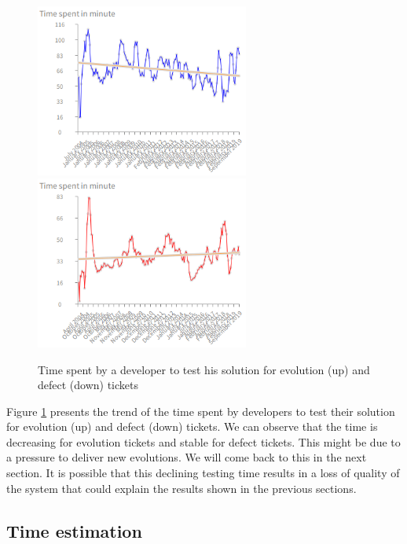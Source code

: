 \documentclass[10pt,conference]{IEEEtran}
\begin{document}
 \begin{figure}[htbp]
  \centering
  \includegraphics[width=70mm]{./images/evolutionTest.png} \\
  \includegraphics[width=70mm]{./images/timeDevTest.png}
  \caption{Time spent by a developer to test his solution for  evolution (up) and defect (down) tickets}
  \label{fig:devTimeTest}
\end{figure}

Figure \ref{fig:devTimeTest} presents the trend of the time spent by developers to test their solution for evolution (up) and defect (down) tickets.
We can observe that the time is decreasing for evolution tickets and stable for defect tickets. 
This might be due to a pressure to deliver new evolutions. We will come back to this in the next section.
It is possible that this declining testing time results in a loss of quality of the system that could explain the results shown in the previous sections.
 
\subsection{Time estimation}

\end{document}
